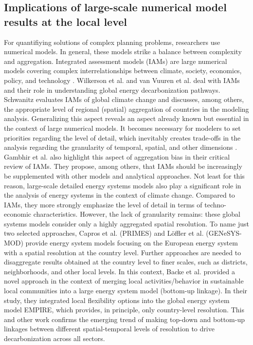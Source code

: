\subsection{Implications of large-scale numerical model results at the local level}
For quantifiying solutions of complex planning problems, researchers use numerical models. In general, these models strike a balance between complexity and aggregation. Integrated assessment models (IAMs) are large numerical models covering complex interrelationships between climate, society, economics, policy, and technology \cite{dowlatabadi1995integrated}. Wilkerson et al. \cite{wilkerson2015comparison} and van Vuuren et al. \cite{van2016carbon} deal with IAMs and their role in understanding global energy decarbonization pathways. Schwanitz \cite{schwanitz2013evaluating} evaluates IAMs of global climate change and discusses, among others, the appropriate level of regional (spatial) aggregation of countries in the modeling analysis. Generalizing this aspect reveals an aspect already known but essential in the context of large numerical models. It becomes necessary for modelers to set priorities regarding the level of detail, which inevitably creates trade-offs in the analysis regarding the granularity of temporal, spatial, and other dimensions \cite{gargiulo2013long}. Gambhir et al. \cite{gambhir2019review} also highlight this aspect of aggregation bias in their critical review of IAMs. They propose, among others, that IAMs should be increasingly be supplemented with other models and analytical approaches. Not least for this reason, large-scale detailed energy systems models also play a significant role in the analysis of energy systems in the context of climate change. Compared to IAMs, they more strongly emphasize the level of detail in terms of techno-economic characteristics. However, the lack of granularity remains: these global systems models consider only a highly aggregated spatial resolution. To name just two selected approaches, Capros et al. \cite{capros2012model} (PRIMES) and Löffler et al. \cite{loffler2017designing} (GENeSYS-MOD) provide energy system models focusing on the European energy system with a spatial resolution at the country level. Further approaches are needed to disaggregate results obtained at the country level to finer scales, such as districts, neighborhoods, and other local levels. In this context, Backe et al. \cite{backe2021heat} provided a novel approach in the context of merging local activities/behavior in sustainable local communities into a large energy system model (bottom-up linkage). In their study, they integrated local flexibility options into the global energy system model EMPIRE, which provides, in principle, only country-level resolution. This and other work confirms the emerging trend of making top-down and bottom-up linkages between different spatial-temporal levels of resolution to drive decarbonization across all sectors.\vspace{0.3cm}

